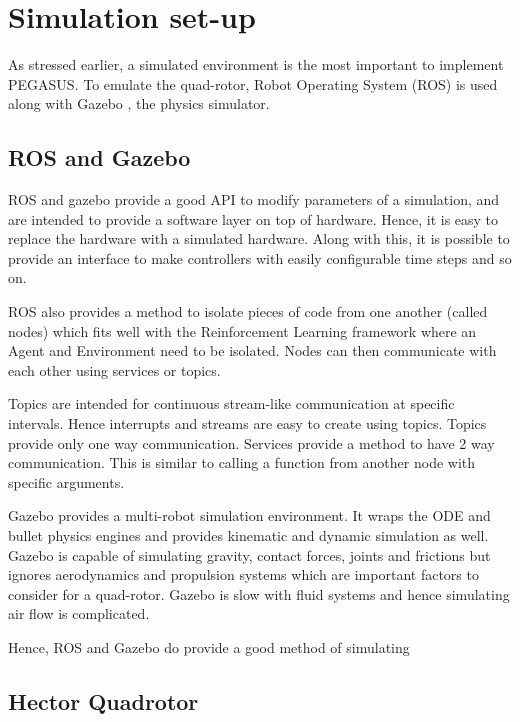 \documentclass[hidelinks,BTech]{iitmdiss}
\begin{document}

\chapter{Simulation set-up}

As stressed earlier, a simulated environment is the most important to implement PEGASUS. To emulate the quad-rotor, Robot Operating System (ROS) \cite{ROS} is used along with Gazebo \cite{Gazebo}, the physics simulator.

\section{ROS and Gazebo}

ROS and gazebo provide a good API to modify parameters of a simulation, and are intended to provide a software layer on top of hardware. Hence, it is easy to replace the hardware with a simulated hardware. Along with this, it is possible to provide an interface to make controllers with easily configurable time steps and so on.

ROS also provides a method to isolate pieces of code from one another (called nodes) which fits well with the Reinforcement Learning framework where an Agent and Environment need to be isolated. Nodes can then communicate with each other using services or topics.

Topics are intended for continuous stream-like communication at specific intervals. Hence interrupts and streams are easy to create using topics. Topics provide only one way communication. Services provide a method to have 2 way communication. This is similar to calling a function from another node with specific arguments.

Gazebo provides a multi-robot simulation environment. It wraps the ODE and bullet physics engines and provides kinematic and dynamic simulation as well. Gazebo is capable of simulating gravity, contact forces, joints and frictions but ignores aerodynamics and propulsion systems which are important factors to consider for a quad-rotor. Gazebo is slow with fluid systems and hence simulating air flow is complicated.

Hence, ROS and Gazebo do provide a good method of simulating

\section{Hector Quadrotor}
\end{document}
